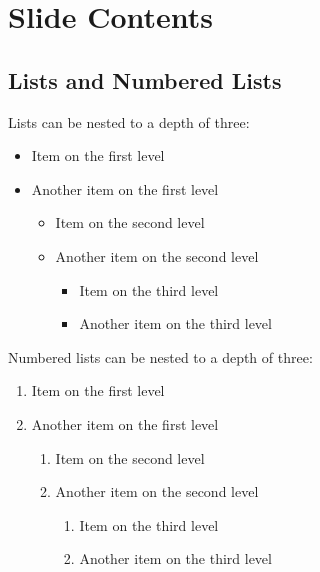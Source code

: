 \documentclass[
	aspectratio=169, %
	8pt, %
]{beamer}
\begin{document}

\section{Slide Contents}


\subsection{Lists and Numbered Lists}
\begin{frame}{\insertsubsection}
	\begin{fancycolumns}
		Lists can be nested to a depth of three:
		\begin{itemize}
			\item Item on the first level
			\item Another item on the first level
			\begin{itemize}
				\item Item on the second level 
				\item Another item on the second level
			\begin{itemize}
			\item Item on the third level
			\item Another item on the third level
			\end{itemize}
		\end{itemize}
	\end{itemize}
	\nextcolumn
	Numbered lists can be nested to a depth of three:
	\begin{enumerate}
		\item Item on the first level
		\item Another item on the first level
		\begin{enumerate}
			\item Item on the second level 
			\item Another item on the second level
				\begin{enumerate}
					\item Item on the third level
					\item Another item on the third level
				\end{enumerate}
			\end{enumerate}
		\end{enumerate}
	\end{fancycolumns}
\end{frame}
\end{document}
